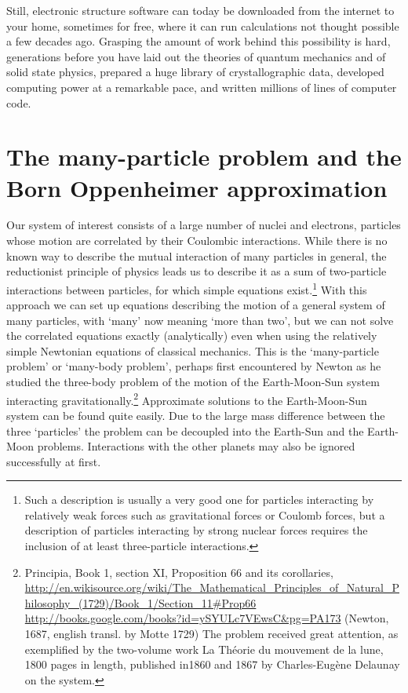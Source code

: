 \documentclass[11pt,bibliography=totoc,index=totoc]{scrbook}   %
\begin{document}
Still, electronic structure software can today be downloaded from the
internet to your home, sometimes for free, where it can run calculations 
not thought possible a few
decades ago. Grasping the amount of work behind this possibility is hard,
generations before you have laid out the theories of quantum mechanics and of
solid state physics, prepared a huge library of crystallographic data, 
developed computing power at a remarkable pace, and written millions of lines
of computer code. 




\section{The many-particle problem and the Born Oppenheimer approximation}

Our system of interest consists of a large number of nuclei and electrons, particles whose motion are correlated by their Coulombic interactions. 
While there is no known way to describe the mutual interaction of many particles in general, the reductionist principle of physics leads us to describe it as a sum of two-particle interactions between particles, for which simple equations exist.\footnote{
Such a description is usually a very good one for particles interacting by relatively weak forces such as gravitational forces or Coulomb forces, but a description of particles interacting by strong nuclear forces requires the inclusion of at least three-particle interactions.}
With this approach we can set up equations describing the motion of a general system of many particles, with `many' now meaning `more than two', but we can not solve the correlated equations exactly (analytically) even when using the relatively simple Newtonian equations of classical mechanics. 
This is the `many-particle problem' or `many-body problem', perhaps first encountered by Newton as he studied the three-body problem of the motion of the Earth-Moon-Sun system interacting gravitationally.\footnote{Principia, Book 1, section XI, Proposition 66 and its corollaries,
\url{http://en.wikisource.org/wiki/The_Mathematical_Principles_of_Natural_Philosophy_(1729)/Book_1/Section_11\#Prop66}
\url{http://books.google.com/books?id=ySYULc7VEwsC&pg=PA173}
(Newton, 1687, english transl. by Motte 1729) 
The problem received great attention, as exemplified by the two-volume work La Théorie du mouvement de la lune, 1800 pages in length, published in1860 and 1867 by Charles-Eugène Delaunay on the system.}
Approximate solutions to the Earth-Moon-Sun system can be found quite easily. 
Due to the large mass difference between the three `particles' the problem can be decoupled into the Earth-Sun and the Earth-Moon problems.
Interactions with the other planets may also be ignored successfully at first.
\end{document}
